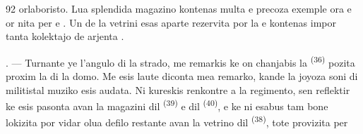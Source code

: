 \begin{VUpage}[94]{92}
\VUcontinue
orlaboristo. Lua splendida magazino kontenas\nl
multa \nl
{} e precoza  exemple \cc
{} ora  e  or\cc
nita per  e . Un de la vetrini esas\nl
aparte rezervita por la  e kontenas impor\cc
tanta kolektajo de arjenta .

. --- Turnante ye l'angulo di la strado, me\nl
remarkis ke on chanjabis la  \textsuperscript{(36)} pozita\nl
proxim la  di la domo. Me esis laute\nl
diconta mea remarko, kande la joyoza soni di\nl
{} militistal muziko esis audata. Ni kureskis\nl
renkontre a la regimento, sen reflektir ke \nl
esis pasonta avan la magazini dil  \textsuperscript{(39)}\nl
e dil  \textsuperscript{(40)}, e ke ni esabus tam bone\nl
lokizita por vidar olua defilo restante avan la\nl
vetrino dil  \textsuperscript{(38)}, tote provizita per
\parplein
\end{VUpage}

